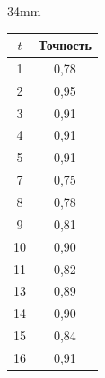 \begin{floatingfigure}{34mm} %


\vspace*{-12pt}


\begin{center}




\vspace*{2ex}





\tabcolsep=11pt


{\small \begin{tabular}{|c|c|}


\hline


$t$ & Точность\\


\hline


\hphantom{9}1&0,78\\


\hphantom{9}2&0,95\\


\hphantom{9}3&0,91\\


\hphantom{9}4&0,91\\


\hphantom{9}5&0,91\\


\hphantom{9}7&0,75\\


\hphantom{9}8&0,78\\


\hphantom{9}9&0,81\\


10&0,90\\


11&0,82\\


13&0,89\\


14&0,90\\


15&0,84\\


16&0,91\\


\hline


\end{tabular}


}


\end{center}




\end{floatingfigure}





